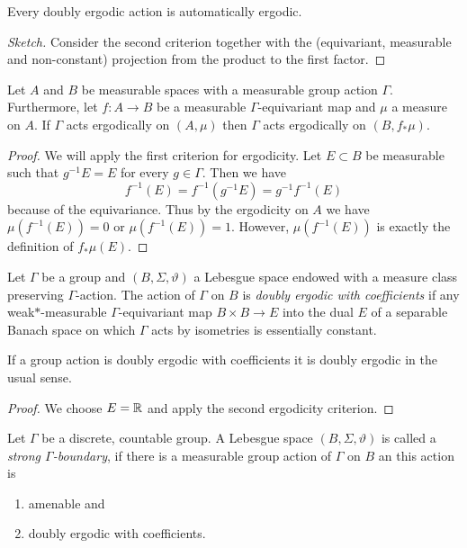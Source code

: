 \begin{prop}
  Every doubly ergodic action is automatically ergodic.
\end{prop}

\begin{proof}[Sketch]
  Consider the second criterion together with the (equivariant, measurable and non-constant) projection from the product to the first factor.
\end{proof}

\begin{lemma}
  \label{lemma:ergodicity-push-forward}
  Let \(A\) and \(B\) be measurable spaces with a measurable group action \(\Gamma\). Furthermore, let \(f\colon A \to B\) be a measurable \(\Gamma\)-equivariant map and \(\mu\) a measure on \(A\). If \(\Gamma\) acts ergodically on \((A, \mu)\) then \(\Gamma\) acts ergodically on \((B, f_\ast \mu)\).
\end{lemma}

\begin{proof}
  We will apply the first criterion for ergodicity. Let \(E \subset B\) be measurable such that \(g^{-1} E = E\) for every \(g \in \Gamma\). Then we have
  \[
    f^{-1}(E) = f^{-1}(g^{-1}E) = g^{-1}f^{-1}(E)
  \]
  because of the equivariance. Thus by the ergodicity on \(A\) we have \(\mu(f^{-1}(E))= 0\) or \(\mu(f^{-1}(E)) = 1\). However, \(\mu(f^{-1}(E))\) is exactly the definition of \(f_\ast\mu(E)\).
\end{proof}

\begin{defin}
  Let \(\Gamma\) be a group and \((B, \Sigma, \vartheta)\) a Lebesgue space endowed with a measure class preserving \(\Gamma\)-action. The action of \(\Gamma\) on \(B\) is \emph{doubly ergodic with coefficients} if any weak\(\ast\)-measurable \(\Gamma\)-equivariant map \(B \times B \to E\) into the dual \(E\) of a separable Banach space on which \(\Gamma\) acts by isometries is essentially constant.
\end{defin}

\begin{prop}
  If a group action is doubly ergodic with coefficients it is doubly ergodic in the usual sense.
\end{prop}

\begin{proof}
  We choose \(E = \mathbb{R}\) and apply the second ergodicity criterion.
\end{proof}

\begin{defin}
  Let \(\Gamma\) be a discrete, countable group. A Lebesgue space \((B, \Sigma, \vartheta)\) is called a \emph{strong \(\Gamma\)-boundary}, if there is a measurable group action of \(\Gamma\) on \(B\) an this action is
  \begin{enumerate}
  \item amenable and
  \item doubly ergodic with coefficients.
  \end{enumerate}
\end{defin}

